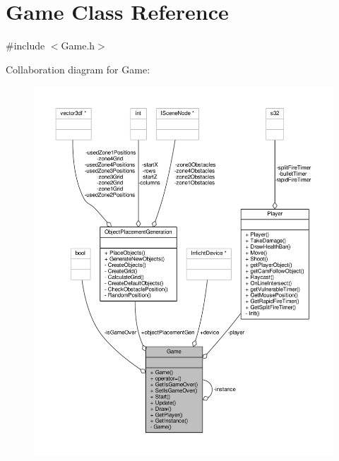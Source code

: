 \hypertarget{class_game}{\section{Game Class Reference}
\label{class_game}
}


{\ttfamily \#include $<$Game.\-h$>$}



Collaboration diagram for Game\-:
\nopagebreak
\begin{figure}[H]
\begin{center}
\leavevmode
\includegraphics[width=350pt]{class_game__coll__graph}
\end{center}
\end{figure}
